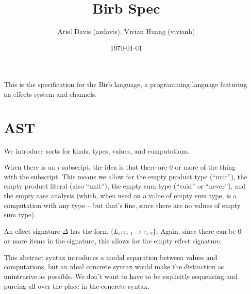 \documentclass[12pt]{article}
\title{Birb Spec}
\author{Ariel Davis (azdavis), Vivian Huang (vivianh)}
\date{\today}
\begin{document}
\maketitle

This is the specification for the Birb language, a programming language
featuring an effects system and channels.

\newpage
\section{AST}

We introduce sorts for kinds, types, values, and computations.

When there is an $i$ subscript, the idea is that there are 0 or more of the
thing with the subscript. This means we allow for the empty product type
(``unit''), the empty product literal (also ``unit''), the empty sum type
(``void'' or ``never''), and the empty case analysis (which, when used on a
value of empty sum type, is a computation with any type -- but that's fine,
since there are no values of empty sum type).

An effect signature $\Delta$ has the form $\{ L_i : \tau_{i,1} \rightarrow
\tau_{i,2} \}$. Again, since there can be 0 or more items in the signature, this
allows for the empty effect signature.

This abstract syntax introduces a modal separation between values and
computations, but an ideal concrete syntax would make the distinction as
unintrusive as possible. We don't want to have to be explicitly sequencing and
\textsf{pure}ing all over the place in the concrete syntax.
\end{document}
